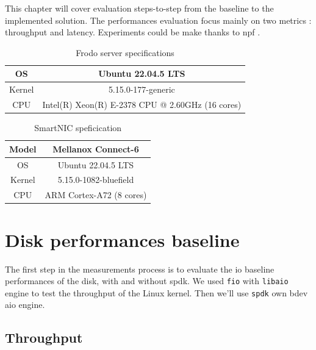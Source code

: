 This chapter will cover evaluation steps-to-step from the baseline to the implemented solution. The performances evaluation focus mainly on two metrics : throughput and latency. Experiments could be make thanks to \acrfull{npf} \cite{barbette_tbarbettenpf_2026}.

\begin{table}[htbp]
    \centering
    \caption{Frodo server specifications}
    \label{table:frodo-specs}
    \begin{tabular}{|c|c|}
        \hline
        OS & Ubuntu 22.04.5 LTS \\
        \hline
        Kernel & 5.15.0-177-generic \\
        \hline
        CPU & Intel(R) Xeon(R) E-2378 CPU @ 2.60GHz (16 cores) \\
        \hline
    \end{tabular}
\end{table}


\begin{table}[htbp]
    \centering
    \caption{SmartNIC speficication}
    \label{table:smartnic-specs}
        \begin{tabular}{|c|c|}
        \hline
        Model & Mellanox Connect-6 \\
        \hline
        OS & Ubuntu 22.04.5 LTS \\
        \hline
        Kernel & 5.15.0-1082-bluefield \\
        \hline
        CPU & ARM Cortex-A72 (8 cores) \\
        \hline
    \end{tabular}
\end{table}

\section{Disk performances baseline}

The first step in the measurements process is to evaluate the \acrfull{io} baseline performances of the disk, with and without \acrshort{spdk}. We used \texttt{\acrfull{fio}} \cite{noauthor_kernelgitaxboefiogit_nodate} with \texttt{libaio} \cite{libaio} engine to test the throughput of the Linux kernel. Then we'll use \texttt{\acrshort{spdk}} own \acrshort{bdev} \acrfull{aio} engine.

\subsection{Throughput}

